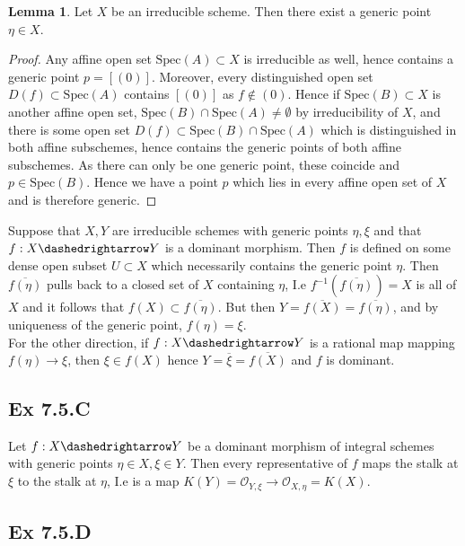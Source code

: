 \documentclass{article}
\theoremstyle{definition}
\newtheorem{lemma}[theorem]{Lemma}
\newcommand{\Spec}{\text{Spec}}
\begin{document}
\begin{lemma}
	Let $X$ be an irreducible scheme. Then there exist a generic point $\eta
		\in X$.
\end{lemma}
\begin{proof}
	Any affine open set $\Spec(A) \subset X$ is irreducible as well, hence
	contains a generic point $p = [(0)]$. Moreover, every distinguished open
	set $D(f) \subset \Spec(A)$ contains $[(0)]$ as $f \not \in (0)$. Hence if
	$\Spec(B) \subset X$ is another affine open set, $\Spec(B) \cap \Spec(A)
		\not = \emptyset$ by irreducibility of $X$, and there is some open set
	$D(f) \subset \Spec(B) \cap \Spec(A)$ which is distinguished in both affine
	subschemes, hence contains the generic points of both affine subschemes. As
	there can only be one generic point, these coincide and $p \in \Spec(B)$.
	Hence we have a point $p$ which lies in every affine open set of $X$ and is
	therefore generic.
\end{proof}

Suppose that $X, Y$ are irreducible schemes with generic points $\eta, \xi$ and
that $f : X \dashedrightarrow Y$ is a dominant morphism. Then $f$ is defined on
some dense open subset $U \subset X$ which necessarily contains the generic
point $\eta$. Then $\overline{f(\eta)}$ pulls back to a closed set of $X$
containing $\eta$, I.e $f^{-1}(\overline{f(\eta)}) = X$ is all of $X$ and it
follows that $f(X) \subset \overline{f(\eta)}$. But then $Y = \overline{f(X)} =
	\overline{f(\eta)}$, and by uniqueness of the generic point, $f(\eta) = \xi$. \\

For the other direction, if $f : X \dashedrightarrow Y$ is a rational map
mapping $f(\eta) \to \xi$, then $\xi \in f(X)$ hence $Y = \overline{\xi} =
	\overline{f(X)}$ and $f$ is dominant.

\subsection*{Ex 7.5.C}

Let $f : X \dashedrightarrow Y$ be a dominant morphism of integral schemes
with generic points $\eta \in X, \xi \in Y$. Then every representative of $f$
maps the stalk at $\xi$ to the stalk at $\eta$, I.e is a map $K(Y) =
	\mathcal{O}_{Y, \xi} \to \mathcal{O}_{X, \eta} = K(X)$.

\subsection*{Ex 7.5.D}
\end{document}
